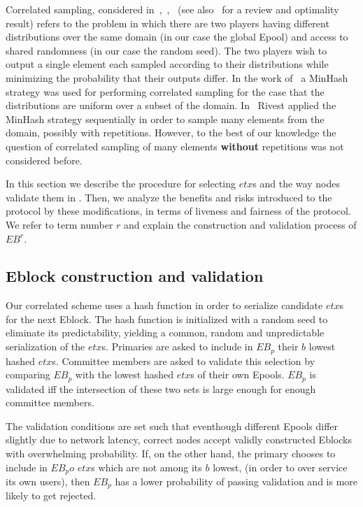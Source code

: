 Correlated sampling, considered in~\cite{HashSample1},~\cite{HashSample2},~\cite{HashSample3} (see 
also~\cite{OptCorSampling} for a review and optimality result) refers to the problem in which there are two players having different distributions over the same domain (in our case the global Epool) and access to shared randomness (in our case the random seed). The two players wish to output a single element each sampled according to their distributions while minimizing the probability that their outputs differ. 
In the work of~\cite{HashSample1} a MinHash strategy was used for performing correlated sampling for the case that the distributions are uniform over a subset of the domain. In~\cite{hashsamplemultiple} Rivest applied the MinHash strategy sequentially in order to sample many elements from the domain, possibly with repetitions. However, to the best of our knowledge the question of correlated sampling of many elements \textbf{without} repetitions was not considered before.   

In this section we describe the procedure for selecting $etx$s and the way nodes validate them in \nameNS. Then, we analyze the benefits and risks introduced to the protocol by these modifications, in terms of liveness and fairness of the protocol.
We refer to term number $r$ and explain the construction and validation process of $EB^r$.

\subsection{Eblock construction and validation}
Our correlated scheme uses a hash function in order to serialize candidate $etx$s for the next Eblock. The hash function is initialized with a random seed to eliminate its predictability, yielding a common, random and unpredictable serialization of the $etx$s. Primaries are asked to include in $EB_p$ their $b$ lowest hashed $etx$s. Committee members are asked to validate this selection by comparing $EB_p$ with the lowest hashed $etx$s of their own Epools. $EB_p$ is validated iff the intersection of these two sets is large enough for enough committee members. 

The validation conditions are set such that eventhough different Epools differ slightly due to network latency, correct nodes accept validly constructed Eblocks with overwhelming probability. If, on the other hand, the primary chooses to include in $EB_po$ $etx$s which are not among its $b$ lowest, (in order to over service its own users), then $EB_p$ has a lower probability of passing validation and is more likely to get rejected. 

